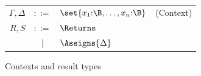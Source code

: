 \begin{figure}[H]
\small
\centering
\begin{tabular}{rcll}
$\Gamma, \Delta$ & $::=$ & $\set{x_1 \mathord{:} \B, \ldots, x_n \mathord{:} \B}$ & (Context) \\[3mm]
$R, S$ & $::=$ & $\Returns$ & \\
    & $\mid$ & $\Assigns{\Delta}$ &
\end{tabular}
\caption{Contexts and result types}
\label{fig:contexts}
\end{figure}

